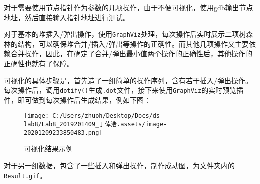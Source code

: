 \documentclass[]{article}
\begin{document}
对于需要使用节点指针作为参数的几项操作，由于不便可视化，使用gdb输出节点地址，然后直接输入指针地址进行测试。

对于基本的堆插入/弹出操作，使用\texttt{GraphViz}处理，每次操作后实时展示二项树森林的结构，可以确保堆合并/插入/弹出等操作的正确性。而其他几项操作又主要依赖合并操作，因此，在确定了合并/弹出最小值两个操作的正确性后，其他操作的正确性也就有了保障。

可视化的具体步骤是，首先造了一组简单的操作序列，含有若干插入/弹出操作。每次操作后，调用\texttt{dotify()}生成\texttt{.dot}文件，接下来使用\texttt{GraphViz}的实时预览插件，即可做到每次操作后生成结果，例如下图：

\begin{figure}
\centering
\texttt{[image: C:/Users/zhuoh/Desktop/Docs/ds-lab8/Lab8\_2019201409\_于倬浩.assets/image-20201209233850483.png]}
\caption{可视化结果示例}
\end{figure}

对于另一组数据，包含了一些插入和弹出操作，制作成动图，为文件夹内的\texttt{Result.gif}。
\end{document}
